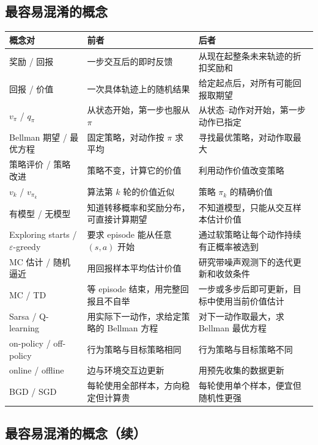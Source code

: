 \documentclass[11pt,a4paper,fontset=fandol]{ctexart}
\begin{document}
\subsection*{最容易混淆的概念}

\begin{center}
\begin{tabularx}{\textwidth}{
  >{\raggedright\arraybackslash}p{}
  >{\raggedright\arraybackslash}p{}
  X}
\toprule
概念对 & 前者 & 后者\\
\midrule
奖励 / 回报 &
一步交互后的即时反馈 &
从现在起整条未来轨迹的折扣奖励和\\
回报 / 价值 &
一次具体轨迹上的随机结果 &
给定起点后，对所有可能回报取期望\\
\(v_\pi\) / \(q_\pi\) &
从状态开始，第一步也服从 \(\pi\) &
从状态--动作对开始，第一步动作已指定\\
Bellman 期望 / 最优方程 &
固定策略，对动作按 \(\pi\) 求平均 &
寻找最优策略，对动作取最大\\
策略评价 / 策略改进 &
策略不变，计算它的价值 &
利用动作价值改变策略\\
\(v_k\) / \(v_{\pi_k}\) &
算法第 \(k\) 轮的价值近似 &
策略 \(\pi_k\) 的精确价值\\
有模型 / 无模型 &
知道转移概率和奖励分布，可直接计算期望 &
不知道模型，只能从交互样本估计价值\\
Exploring starts / \(\varepsilon\)-greedy &
要求 episode 能从任意 \((s,a)\) 开始 &
通过软策略让每个动作持续有正概率被选到\\
MC 估计 / 随机逼近 &
用回报样本平均估计价值 &
研究带噪声观测下的迭代更新和收敛条件\\
MC / TD &
等 episode 结束，用完整回报且不自举 &
一步或多步后即可更新，目标中使用当前价值估计\\
Sarsa / Q-learning &
用实际下一动作，求给定策略的 Bellman 方程 &
对下一动作取最大，求 Bellman 最优方程\\
on-policy / off-policy &
行为策略与目标策略相同 &
行为策略与目标策略不同\\
online / offline &
边与环境交互边更新 &
用预先收集的数据更新\\
BGD / SGD &
每轮使用全部样本，方向稳定但计算贵 &
每轮使用单个样本，便宜但随机性更强\\
\bottomrule
\end{tabularx}
\end{center}

\clearpage
\subsection*{最容易混淆的概念（续）}
\end{document}
